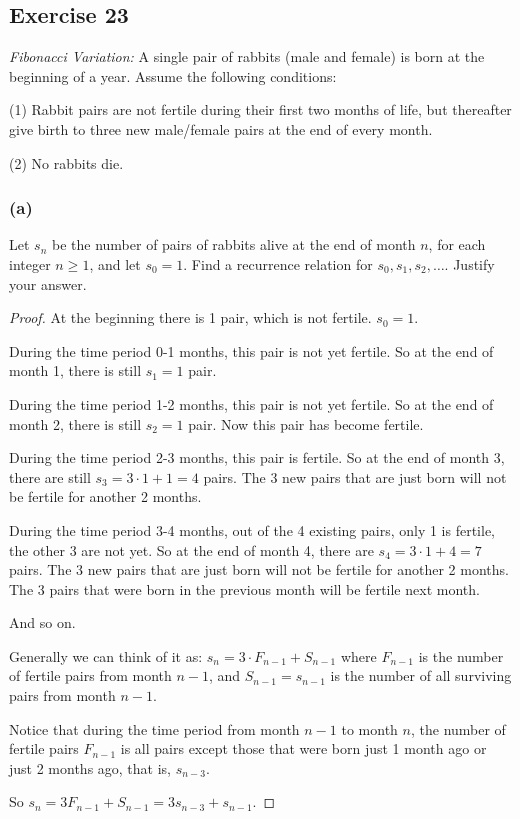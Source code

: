 \documentclass[14pt]{extarticle}
\begin{document}
\subsection{Exercise 23}
{\it Fibonacci Variation:} A single pair of rabbits (male and female) is born at the beginning of a year.
Assume the following conditions:

(1) Rabbit pairs are not fertile during their first two months of life, but thereafter give birth to three new
male/female pairs at the end of every month.

(2) No rabbits die.

\subsubsection{(a)}
Let $s_n$ be the number of pairs of rabbits alive at the end of month $n$, for each integer $n \geq 1$, and let
$s_0 = 1$. Find a recurrence relation for $s_0, s_1, s_2, \ldots$. Justify your answer.

\begin{proof}
    At the beginning there is 1 pair, which is not fertile. $s_0 = 1$.

    During the time period 0-1 months, this pair is not yet fertile. So at the end of month 1, there is still $s_1 = 1$
    pair.

    During the time period 1-2 months, this pair is not yet fertile. So at the end of month 2, there is still $s_2 = 1$
    pair. Now this pair has become fertile.

    During the time period 2-3 months, this pair is fertile. So at the end of month 3, there are still
    $s_3 = 3 \cdot 1 + 1 = 4$ pairs. The 3 new pairs that are just born will not be fertile for another 2 months.

    During the time period 3-4 months, out of the 4 existing pairs, only 1 is fertile, the other 3 are not yet. So at
    the end of month 4, there are $s_4 = 3 \cdot 1 + 4 = 7$ pairs. The 3 new pairs that are just born will not be
    fertile for another 2 months. The 3 pairs that were born in the previous month will be fertile next month.

    And so on.

    Generally we can think of it as: $s_n = 3 \cdot F_{n-1} + S_{n-1}$ where $F_{n-1}$ is the number of fertile pairs
    from month $n-1$, and $S_{n-1} = s_{n-1}$ is the number of all surviving pairs from month $n-1$.

    Notice that during the time period from month $n-1$ to month $n$, the number of fertile pairs $F_{n-1}$ is all
    pairs except those that were born just 1 month ago or just 2 months ago, that is, $s_{n-3}$.

    So $s_n = 3F_{n-1} + S_{n-1} = 3s_{n-3} + s_{n-1}$.
\end{proof}
\end{document}
